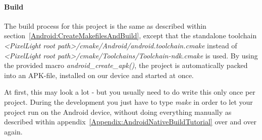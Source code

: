 \paragraph{Build}
The build process for this project is the same as described within section~\ref{Android:CreateMakefilesAndBuild}, except that the standalone toolchain \emph{<PixelLight root path>/cmake/Android/android.toolchain.cmake} instead of \emph{<PixelLight root path>/cmake/Toolchains/Toolchain-ndk.cmake} is used. By using the provided macro \emph{android\_create\_apk()}, the project is automatically packed into an \ac{APK}-file, installed on our device and started at once.

At first, this may look a lot - but you usually need to do write this only once per project. During the development you just have to type \emph{make} in order to let your project run on the Android device, without doing everything manually as described within appendix~\ref{Appendix:AndroidNativeBuildTutorial} over and over again.

